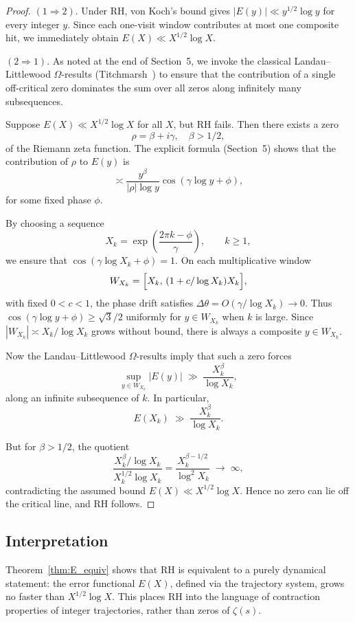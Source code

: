 \documentclass[11pt]{article}
\theoremstyle{plain}
\theoremstyle{definition}
\theoremstyle{remark}
\begin{document}
\begin{proof}
$(1\Rightarrow 2)$.
Under RH, von Koch’s bound gives $|E(y)|\ll y^{1/2}\log y$ for every integer $y$. Since each one-visit window contributes at most one composite hit, we immediately obtain $E(X)\ll X^{1/2}\log X$.

$(2\Rightarrow 1)$.
As noted at the end of Section~5, we invoke the classical Landau--Littlewood $\Omega$-results (Titchmarsh~\cite[§14.25]{Titchmarsh}) to ensure that the contribution of a single off-critical zero dominates the sum over all zeros along infinitely many subsequences.

Suppose $E(X)\ll X^{1/2}\log X$ for all $X$, but RH fails. Then there exists a zero
\[
\rho=\beta+i\gamma,\quad \beta>1/2,
\]
of the Riemann zeta function. The explicit formula (Section~5) shows that the contribution of $\rho$ to $E(y)$ is
\[
\asymp \frac{y^\beta}{|\rho|\log y}\cos(\gamma\log y+\phi),
\]
for some fixed phase $\phi$.

By choosing a sequence
\[
X_k=\exp\!\left(\frac{2\pi k-\phi}{\gamma}\right),\qquad k\ge1,
\]
we ensure that $\cos(\gamma\log X_k+\phi)=1$. On each multiplicative window
\[
W_{X_k}=\Bigl[X_k,\,(1+c/\log X_k)X_k\Bigr],
\]
with fixed $0<c<1$, the phase drift satisfies
$\Delta\theta = O(\gamma/\log X_k)\to0$. Thus $\cos(\gamma\log y+\phi)\ge\sqrt{3}/2$ uniformly for $y\in W_{X_k}$ when $k$ is large. Since $|W_{X_k}|\asymp X_k/\log X_k$ grows without bound, there is always a composite $y\in W_{X_k}$.

Now the Landau--Littlewood $\Omega$-results imply that such a zero forces
\[
\sup_{y\in W_{X_k}} |E(y)|\;\gg\;\frac{X_k^\beta}{\log X_k},
\]
along an infinite subsequence of $k$. In particular,
\[
E(X_k)\;\gg\; \frac{X_k^\beta}{\log X_k}.
\]

But for $\beta>1/2$, the quotient
\[
\frac{X_k^\beta/\log X_k}{X_k^{1/2}\log X_k}
=\frac{X_k^{\beta-1/2}}{\log^2X_k}\;\to\;\infty,
\]
contradicting the assumed bound $E(X)\ll X^{1/2}\log X$. Hence no zero can lie off the critical line, and RH follows.
\end{proof}

\subsection{Interpretation}

Theorem~\ref{thm:E_equiv} shows that RH is equivalent to a purely dynamical statement: the error functional $E(X)$, defined via the trajectory system, grows no faster than $X^{1/2}\log X$. This places RH into the language of contraction properties of integer trajectories, rather than zeros of $\zeta(s)$.
\end{document}
